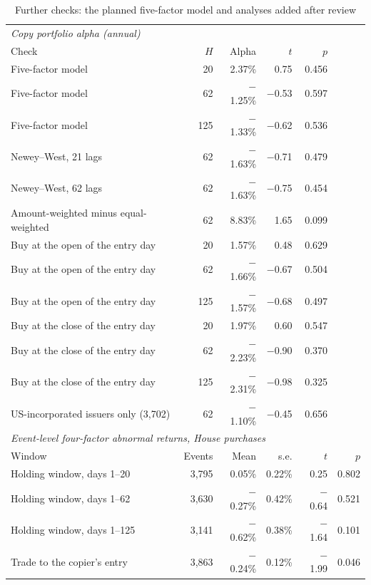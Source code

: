 \documentclass[11pt]{article}
\newcommand{\m}{\ensuremath{-}}
\begin{document}
\begin{table}[H]
\centering
\caption{Further checks: the planned five-factor model and analyses added after review}\label{tab:extra}
\begin{tabular}{lrrrrr}
\toprule
\multicolumn{6}{l}{\textit{Copy portfolio alpha (annual)}} \\
Check & $H$ & Alpha & $t$ & $p$ & \\
\midrule
Five-factor model & 20 & 2.37\% & 0.75 & 0.456 & \\
Five-factor model & 62 & \m1.25\% & \m0.53 & 0.597 & \\
Five-factor model & 125 & \m1.33\% & \m0.62 & 0.536 & \\
Newey--West, 21 lags & 62 & \m1.63\% & \m0.71 & 0.479 & \\
Newey--West, 62 lags & 62 & \m1.63\% & \m0.75 & 0.454 & \\
Amount-weighted minus equal-weighted & 62 & 8.83\% & 1.65 & 0.099 & \\
Buy at the open of the entry day & 20 & 1.57\% & 0.48 & 0.629 & \\
Buy at the open of the entry day & 62 & \m1.66\% & \m0.67 & 0.504 & \\
Buy at the open of the entry day & 125 & \m1.57\% & \m0.68 & 0.497 & \\
Buy at the close of the entry day & 20 & 1.97\% & 0.60 & 0.547 & \\
Buy at the close of the entry day & 62 & \m2.23\% & \m0.90 & 0.370 & \\
Buy at the close of the entry day & 125 & \m2.31\% & \m0.98 & 0.325 & \\
US-incorporated issuers only (3,702) & 62 & \m1.10\% & \m0.45 & 0.656 & \\
\midrule
\multicolumn{6}{l}{\textit{Event-level four-factor abnormal returns, House purchases}} \\
Window & Events & Mean & s.e. & $t$ & $p$ \\
\midrule
Holding window, days 1--20 & 3,795 & 0.05\% & 0.22\% & 0.25 & 0.802 \\
Holding window, days 1--62 & 3,630 & \m0.27\% & 0.42\% & \m0.64 & 0.521 \\
Holding window, days 1--125 & 3,141 & \m0.62\% & 0.38\% & \m1.64 & 0.101 \\
Trade to the copier's entry & 3,863 & \m0.24\% & 0.12\% & \m1.99 & 0.046 \\
\bottomrule
\end{tabular}


\end{table}
\end{document}
